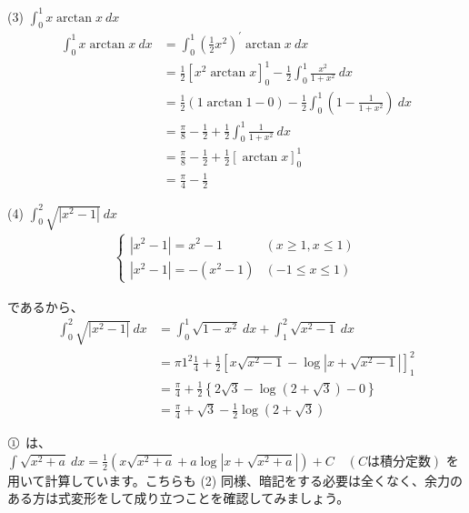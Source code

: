 \documentclass[a4j]{jsarticle}
\newcommand{\ctext}[1]{\raise0.2ex\hbox{\textcircled{\scriptsize{#1}}}} %
\begin{document}
    (3) $\displaystyle \int_{0}^{1} x \arctan x  \: dx$ \\

    \begin{align*}
        \int_{0}^{1} x \arctan x  \: dx &= \int_{0}^{1} \left(\frac{1}{2}x^2\right)^{\prime} \arctan x \: dx \\
        &= \frac{1}{2} \left[x^2 \arctan x\right]_{0}^{1} - \frac{1}{2} \int_{0}^{1} \frac{x^2}{1 + x^2}  \: dx \\
        &= \frac{1}{2} (1 \arctan1 - 0) - \frac{1}{2} \int_{0}^{1} \left(1 - \frac{1}{1 + x^2}\right) \: dx \\
        &= \frac{\pi}{8} - \frac{1}{2} + \frac{1}{2} \int_{0}^{1} \frac{1}{1 + x^2}  \: dx \\
        &= \frac{\pi}{8} - \frac{1}{2} + \frac{1}{2} \left[\arctan x\right]_{0}^{1} \\
        &= \frac{\pi}{4} - \frac{1}{2}
    \end{align*}

    (4) $\displaystyle \int_{0}^{2} \sqrt{|x^2 - 1|}  \: dx$ \\

    \begin{align*}
        \begin{cases}
          |x^2 - 1| = x^2 - 1 & (x \geq 1, x \leq 1) \\
          |x^2 - 1| = - (x^2 - 1) & (-1 \leq x \leq 1)
        \end{cases}
    \end{align*}
    
    であるから、
    \begin{align*}
        \int_{0}^{2} \sqrt{|x^2 - 1|}  \: dx &= \int_{0}^{1} \sqrt{1 - x^2}  \: dx + \int_{1}^{2} \sqrt{x^2 - 1}  \: dx \\
        &= \pi 1^2 \frac{1}{4} + \frac{1}{2} \left[x\sqrt{x^2 - 1} - \log \left|x + \sqrt{x^2 - 1}\right|\right]_{1}^{2} \\
        &= \frac{\pi}{4} + \frac{1}{2} \left\{2\sqrt{3} - \log(2 + \sqrt{3}) - 0\right\} \\
        &= \frac{\pi}{4} + \sqrt{3} - \frac{1}{2} \log (2 + \sqrt{3})
    \end{align*}

    \begin{screen}
        $\ctext{1}$ は、$ \displaystyle \int \sqrt{x^2 + a}  \: dx = \frac{1}{2} (x\sqrt{x^2 + a} + a\log \left|x + \sqrt{x^2 + a}\right|) + C \quad (C は積分定数)$
        を用いて計算しています。こちらも (2) 同様、暗記をする必要は全くなく、余力のある方は式変形をして成り立つことを確認してみましょう。
    \end{screen}
    \\
\end{document}
